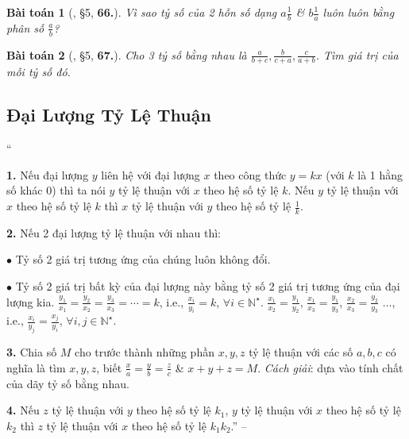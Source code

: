 \documentclass{article}
\numberwithin{equation}{section}
\newtheorem{baitoan}{Bài toán}
\begin{document}
\begin{baitoan}[\cite{Binh_Toan_7_tap_1}, \S5, \textbf{66.}]
	Vì sao tỷ số của 2 hỗn số dạng $a\frac{1}{b}$ \& $b\frac{1}{a}$ luôn luôn bằng phân số $\frac{a}{b}$?
\end{baitoan}

\begin{baitoan}[\cite{Binh_Toan_7_tap_1}, \S5, \textbf{67.}]
	Cho 3 tỷ số bằng nhau là $\frac{a}{b + c},\frac{b}{c + a},\frac{c}{a + b}$. Tìm giá trị của mỗi tỷ số đó.
\end{baitoan}


\subsection{Đại Lượng Tỷ Lệ Thuận}
``\begin{enumerate*}
	\item[\textbf{1.}] Nếu đại lượng $y$ liên hệ với đại lượng $x$ theo công thức $y = kx$ (với $k$ là 1 hằng số khác $0$) thì ta nói $y$ tỷ lệ thuận với $x$ theo hệ số tỷ lệ $k$. Nếu $y$ tỷ lệ thuận với $x$ theo hệ số tỷ lệ $k$ thì $x$ tỷ lệ thuận với $y$ theo hệ số tỷ lệ $\frac{1}{k}$.
	\item[\textbf{2.}] Nếu 2 đại lượng tỷ lệ thuận với nhau thì:
	\begin{enumerate*}
		\item[$\bullet$] Tỷ số 2 giá trị tương ứng của chúng luôn không đổi.
		\item[$\bullet$] Tỷ số 2 giá trị bất kỳ của đại lượng này bằng tỷ số 2 giá trị tương ứng của đại lượng kia. $\frac{y_1}{x_1} = \frac{y_2}{x_2} = \frac{y_3}{x_3} = \cdots = k$, i.e., $\frac{x_i}{y_i} = k$, $\forall i\in\mathbb{N}^\star$. $\frac{x_1}{x_2} = \frac{y_1}{y_2}$, $\frac{x_1}{x_3} = \frac{y_1}{y_3}$, $\frac{x_2}{x_3} = \frac{y_2}{y_3}$ $\ldots$, i.e., $\frac{x_i}{y_j} = \frac{x_j}{y_i}$, $\forall i,j\in\mathbb{N}^\star$.
		\end{enumerate*}
	\item[\textbf{3.}] Chia số $M$ cho trước thành những phần $x,y,z$ tỷ lệ thuận với các số $a,b,c$ có nghĩa là tìm $x,y,z$, biết $\frac{x}{a} = \frac{y}{b} = \frac{z}{c}$ \& $x + y + z = M$. \textit{Cách giải}: dựa vào tính chất của dãy tỷ số bằng nhau.
	\item[\textbf{4.}] Nếu $z$ tỷ lệ thuận với $y$ theo hệ số tỷ lệ $k_1$, $y$ tỷ lệ thuận với $x$ theo hệ số tỷ lệ $k_2$ thì $z$ tỷ lệ thuận với $x$ theo hệ số tỷ lệ $k_1k_2$.'' -- \cite[Chap. 2, \S7, pp. 30--31]{Tuyen_Toan_7}
\end{enumerate*}
\end{document}

